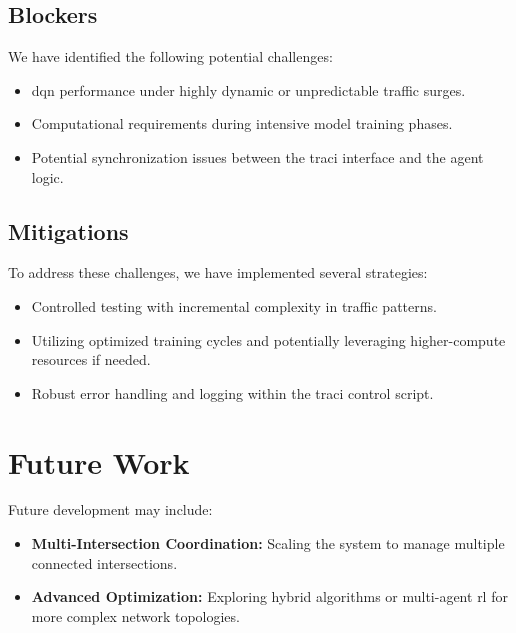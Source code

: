 \subsection{Blockers}
\label{subsec:blockers}
We have identified the following potential challenges:
\begin{itemize}
    \item \gls{dqn} performance under highly dynamic or unpredictable traffic surges.
    \item Computational requirements during intensive model training phases.
    \item Potential synchronization issues between the \gls{traci} interface and the agent logic.
\end{itemize}

\subsection{Mitigations}
\label{subsec:mitigations}
To address these challenges, we have implemented several strategies:
\begin{itemize}
    \item Controlled testing with incremental complexity in traffic patterns.
    \item Utilizing optimized training cycles and potentially leveraging higher-compute resources if needed.
    \item Robust error handling and logging within the \gls{traci} control script.
\end{itemize}

\section{Future Work}
\label{sec:remaining_future_work}
Future development may include:
\begin{itemize}
    \item \textbf{Multi-Intersection Coordination:} Scaling the system to manage multiple connected intersections.
    \item \textbf{Advanced Optimization:} Exploring hybrid algorithms or multi-agent \gls{rl} for more complex network topologies.
\end{itemize}
